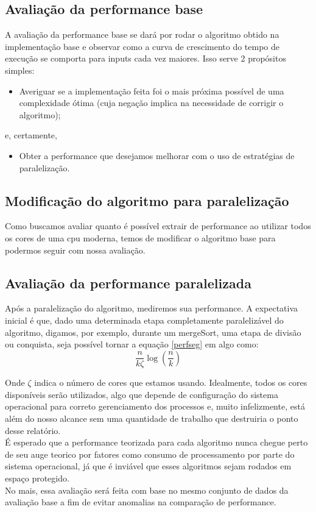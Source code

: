 \documentclass{article}
\begin{document}
\subsection{Avaliação da performance base}
A avaliação da performance base se dará por rodar o algoritmo obtido na implementação base e observar como a curva de crescimento do tempo de execução se comporta para inputs cada vez maiores. Isso serve 2 propósitos simples:
\begin{itemize}
    \item Averiguar se a implementação feita foi o mais próxima possível de uma complexidade ótima (cuja negação implica na necessidade de corrigir o algoritmo);
\end{itemize}
e, certamente,
\begin{itemize}
    \item Obter a performance que desejamos melhorar com o uso de estratégias de paralelização.
\end{itemize}

\subsection{Modificação do algoritmo para paralelização}
Como buscamos avaliar quanto é possível extrair de performance ao utilizar todos os cores de uma cpu moderna, temos de modificar o algoritmo base para podermos seguir com nossa avaliação.

\subsection{Avaliação da performance paralelizada}
Após a paralelização do algoritmo, mediremos sua performance. A expectativa inicial é que, dado uma determinada etapa completamente paralelizável do algoritmo, digamos, por exemplo, durante um mergeSort, uma etapa de divisão ou conquista, seja possível tornar a equação \eqref{perfseg} em algo como: 
    \begin{equation}
        \frac{n}{k\zeta} \log(\frac{n}{k})
    \end{equation}

Onde $\zeta$ indica o número de cores que estamos usando. Idealmente, todos os cores disponíveis serão utilizados, algo que depende de configuração do sistema operacional para correto gerenciamento dos processos e, muito infelizmente, está além do nosso alcance sem uma quantidade de trabalho que destruiria o ponto desse relatório.\\
É esperado que a performance teorizada para cada algoritmo nunca chegue perto de seu auge teorico por fatores como consumo de processamento por parte do sistema operacional, já que é inviável que esses algoritmos sejam rodados em espaço protegido.\\
No mais, essa avaliação será feita com base no mesmo conjunto de dados da avaliação base a fim de evitar anomalias na comparação de performance.
\end{document}
